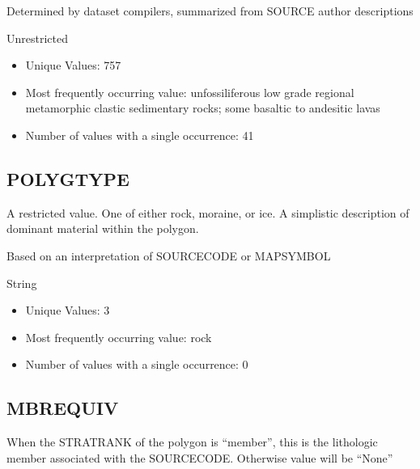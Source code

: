 \documentclass[letterpaper,10pt,english]{sphinxmanual}
\begin{document}
Determined by dataset compilers, summarized from SOURCE author descriptions


Unrestricted

\begin{itemize}
\item {} 
Unique Values: 757

\item {} 
Most frequently occurring value: unfossiliferous low grade regional metamorphic clastic sedimentary rocks; some basaltic to andesitic lavas

\item {} 
Number of values with a single occurrence: 41

\end{itemize}


\subsection{POLYGTYPE}
\label{\detokenize{field_glossary:polygtype}}
A restricted value. One of either rock, moraine, or ice. A simplistic description of dominant material within the polygon.

Based on an interpretation of SOURCECODE or MAPSYMBOL

String


\begin{itemize}
\item {} 
Unique Values: 3

\item {} 
Most frequently occurring value: rock

\item {} 
Number of values with a single occurrence: 0

\end{itemize}


\subsection{MBREQUIV}
\label{\detokenize{field_glossary:mbrequiv}}
When the STRATRANK of the polygon is “member”, this is the lithologic member associated with the SOURCECODE. Otherwise value will be “None”
\end{document}
